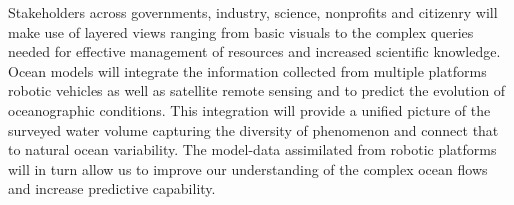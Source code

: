 \documentclass[12pt]{article}
\begin{document}
Stakeholders across governments, industry, science, nonprofits and
citizenry will make use of layered views ranging from basic visuals to
the complex queries needed for effective management of resources and
increased scientific knowledge.  Ocean models will integrate the
information collected from multiple platforms robotic vehicles as well
as satellite remote sensing and to predict the evolution of
oceanographic conditions. This integration will provide a unified
picture of the surveyed water volume capturing the diversity of
phenomenon and connect that to natural ocean variability. The
model-data assimilated from robotic platforms will in turn allow us to
improve our understanding of the complex ocean flows and increase
predictive capability.



\end{document}
